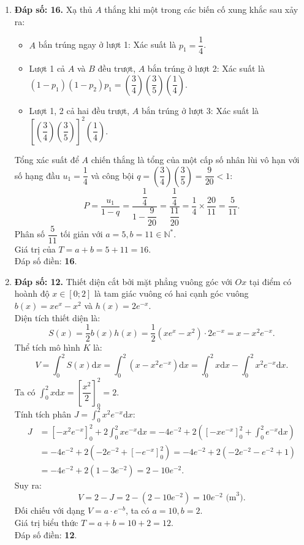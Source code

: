 \documentclass[12pt,a4paper]{article}
\begin{document}
\begin{enumerate}[label=\textbf{Câu \arabic*:}, leftmargin=*]
\item \textbf{Đáp số: 16.}
Xạ thủ $A$ thắng khi một trong các biến cố xung khắc sau xảy ra:
\begin{itemize}
    \item $A$ bắn trúng ngay ở lượt 1: Xác suất là $p_1 = \dfrac{1}{4}$.
    \item Lượt 1 cả $A$ và $B$ đều trượt, $A$ bắn trúng ở lượt 2: Xác suất là $(1 - p_1)(1 - p_2)p_1 = \left(\dfrac{3}{4}\right)\left(\dfrac{3}{5}\right)\left(\dfrac{1}{4}\right)$.
    \item Lượt 1, 2 cả hai đều trượt, $A$ bắn trúng ở lượt 3: Xác suất là $\left[\left(\dfrac{3}{4}\right)\left(\dfrac{3}{5}\right)\right]^2 \left(\dfrac{1}{4}\right)$.
\end{itemize}
Tổng xác suất để $A$ chiến thắng là tổng của một cấp số nhân lùi vô hạn với số hạng đầu $u_1 = \dfrac{1}{4}$ và công bội $q = \left(\dfrac{3}{4}\right)\left(\dfrac{3}{5}\right) = \dfrac{9}{20} < 1$:
$$P = \dfrac{u_1}{1 - q} = \dfrac{\dfrac{1}{4}}{1 - \dfrac{9}{20}} = \dfrac{\dfrac{1}{4}}{\dfrac{11}{20}} = \dfrac{1}{4} \times \dfrac{20}{11} = \dfrac{5}{11}.$$
Phân số $\dfrac{5}{11}$ tối giản với $a = 5, b = 11 \in \mathbb{N}^*$.\\
Giá trị của $T = a + b = 5 + 11 = 16$.\\
Đáp số điền: \textbf{16}.

\item \textbf{Đáp số: 12.}
Thiết diện cắt bởi mặt phẳng vuông góc với $Ox$ tại điểm có hoành độ $x \in [0; 2]$ là tam giác vuông có hai cạnh góc vuông $b(x) = x e^x - x^2$ và $h(x) = 2e^{-x}$.\\
Diện tích thiết diện là:
$$S(x) = \dfrac{1}{2} b(x) h(x) = \dfrac{1}{2} (x e^x - x^2) \cdot 2e^{-x} = x - x^2 e^{-x}.$$
Thể tích mô hình $K$ là:
$$V = \int_0^2 S(x) \mathrm{d}x = \int_0^2 (x - x^2 e^{-x}) \mathrm{d}x = \int_0^2 x \mathrm{d}x - \int_0^2 x^2 e^{-x} \mathrm{d}x.$$
Ta có $\int_0^2 x \mathrm{d}x = \left[ \dfrac{x^2}{2} \right]_0^2 = 2$.\\
Tính tích phân $J = \int_0^2 x^2 e^{-x} \mathrm{d}x$:
\begin{align*}
J &= \left[ -x^2 e^{-x} \right]_0^2 + 2\int_0^2 x e^{-x} \mathrm{d}x = -4e^{-2} + 2\left( \left[ -x e^{-x} \right]_0^2 + \int_0^2 e^{-x} \mathrm{d}x \right) \\
&= -4e^{-2} + 2\left( -2e^{-2} + \left[ -e^{-x} \right]_0^2 \right) = -4e^{-2} + 2\left( -2e^{-2} - e^{-2} + 1 \right) \\
&= -4e^{-2} + 2\left( 1 - 3e^{-2} \right) = 2 - 10e^{-2}.
\end{align*}
Suy ra:
$$V = 2 - J = 2 - (2 - 10e^{-2}) = 10e^{-2}\text{ (m}^3\text{)}.$$
Đối chiếu với dạng $V = a \cdot e^{-b}$, ta có $a = 10, b = 2$.\\
Giá trị biểu thức $T = a + b = 10 + 2 = 12$.\\
Đáp số điền: \textbf{12}.
\end{enumerate}
\end{document}
